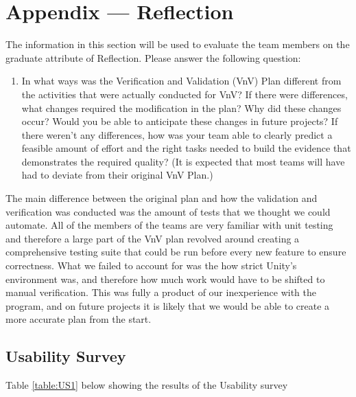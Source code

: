 \documentclass[12pt, titlepage]{article}
\begin{document}



\newpage{}
\section{Appendix --- Reflection}

The information in this section will be used to evaluate the team members on the
graduate attribute of Reflection.  Please answer the following question:

\begin{enumerate}
  \item In what ways was the Verification and Validation (VnV) Plan different
  from the activities that were actually conducted for VnV?  If there were
  differences, what changes required the modification in the plan?  Why did
  these changes occur?  Would you be able to anticipate these changes in future
  projects?  If there weren't any differences, how was your team able to clearly
  predict a feasible amount of effort and the right tasks needed to build the
  evidence that demonstrates the required quality?  (It is expected that most
  teams will have had to deviate from their original VnV Plan.)
\end{enumerate}

The main difference between the original plan and how the validation and verification was conducted was the amount of tests that we thought we could automate. All of the members of the teams are very familiar with unit testing and therefore a large part of the VnV plan revolved around creating a comprehensive testing suite that could be run before every new feature to ensure correctness. What we failed to account for was the how strict Unity's environment was, and therefore how much work would have to be shifted to manual verification. This was fully a product of our inexperience with the program, and on future projects it is likely that we would be able to create a more accurate plan from the start. 



\subsection{Usability Survey}

Table \ref{table:US1} below showing the results of the Usability survey
\end{document}
